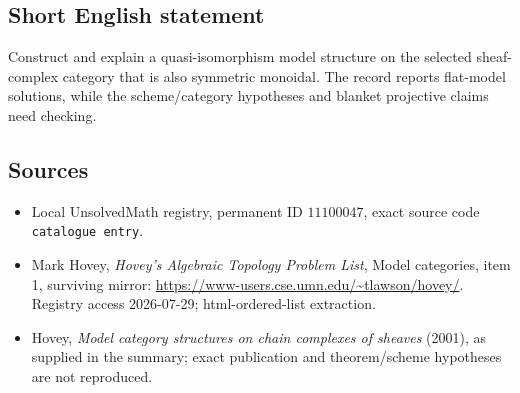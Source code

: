 \documentclass[11pt]{article}
\begin{document}
\subsection{Short English statement}
Construct and explain a quasi-isomorphism model structure on the selected sheaf-complex category that is also symmetric monoidal. The record reports flat-model solutions, while the scheme/category hypotheses and blanket projective claims need checking.
\subsection{Sources}
\begin{itemize}
\item Local UnsolvedMath registry, permanent ID \(11100047\), exact source code \texttt{catalogue entry}.
\item Mark Hovey, \emph{Hovey's Algebraic Topology Problem List}, Model categories, item 1, surviving mirror: \url{https://www-users.cse.umn.edu/~tlawson/hovey/}. Registry access 2026-07-29; html-ordered-list extraction.
\item Hovey, \emph{Model category structures on chain complexes of sheaves} (2001), as supplied in the summary; exact publication and theorem/scheme hypotheses are not reproduced.
\end{itemize}
\end{document}
